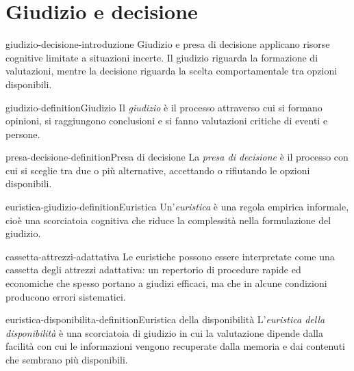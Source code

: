 \documentclass[preview]{standalone}
\begin{document}
\genpage

\section{Giudizio e decisione}

\begin{snippet}{giudizio-decisione-introduzione}
    Giudizio e presa di decisione applicano risorse cognitive limitate a
    situazioni incerte. Il giudizio riguarda la formazione di valutazioni,
    mentre la decisione riguarda la scelta comportamentale tra opzioni
    disponibili.
\end{snippet}

\begin{snippetdefinition}{giudizio-definition}{Giudizio}
    Il \emph{giudizio} è il processo attraverso cui si formano opinioni, si
    raggiungono conclusioni e si fanno valutazioni critiche di eventi e persone.
\end{snippetdefinition}

\begin{snippetdefinition}{presa-decisione-definition}{Presa di decisione}
    La \emph{presa di decisione} è il processo con cui si sceglie tra due o più
    alternative, accettando o rifiutando le opzioni disponibili.
\end{snippetdefinition}

\begin{snippetdefinition}{euristica-giudizio-definition}{Euristica}
    Un'\emph{euristica} è una regola empirica informale, cioè una scorciatoia
    cognitiva che riduce la complessità nella formulazione del giudizio.
\end{snippetdefinition}

\begin{snippet}{cassetta-attrezzi-adattativa}
    Le euristiche possono essere interpretate come una cassetta degli attrezzi
    adattativa: un repertorio di procedure rapide ed economiche che spesso
    portano a giudizi efficaci, ma che in alcune condizioni producono errori
    sistematici.
\end{snippet}

\begin{snippetdefinition}{euristica-disponibilita-definition}{Euristica della disponibilità}
    L'\emph{euristica della disponibilità} è una scorciatoia di giudizio in cui
    la valutazione dipende dalla facilità con cui le informazioni vengono
    recuperate dalla memoria e dai contenuti che sembrano più disponibili.
\end{snippetdefinition}
\end{document}
